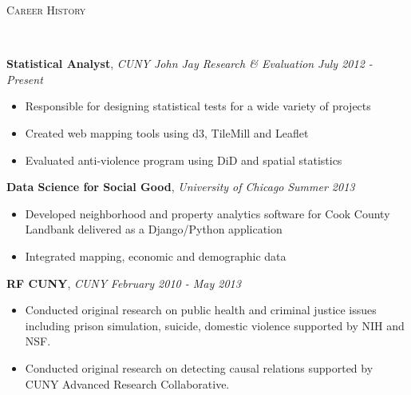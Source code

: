 \documentclass[9pt]{article}
\newenvironment{changemargin}[2]{%
  \begin{list}{}{%
    \setlength{\topsep}{0pt}%
    \setlength{\leftmargin}{#1}%
    \setlength{\rightmargin}{#2}%
    \setlength{\listparindent}{\parindent}%
    \setlength{\itemindent}{\parindent}%
    \setlength{\parsep}{\parskip}%
  }%
  \item[]}{\end{list}
}
\newcommand{\lineover}{
	\begin{changemargin}{-0.05in}{-0.05in}
		\vspace*{-8pt}
		\hrulefill \\
		\vspace*{-2pt}
	\end{changemargin}
}
\newcommand{\header}[1]{
	\begin{changemargin}{-0.5in}{-0.5in}
		\scshape{#1}\\
  	\lineover
	\end{changemargin}
}
\newenvironment{body} {
	\vspace*{-16pt}
	\begin{changemargin}{-0.25in}{-0.5in}
  }	
	{\end{changemargin}
}
\begin{document}
\smallskip



\header{Career History}

\begin{body}
	\vspace{14pt}
	\textbf{Statistical Analyst}, \emph{CUNY John Jay Research \& Evaluation} \hfill \emph{July 2012 - Present}\\
	\vspace*{-4pt}
	\begin{itemize} \itemsep -0pt  %
		\item Responsible for designing statistical tests for  a wide variety of projects
                \item Created web mapping tools using d3, TileMill and Leaflet
                \item Evaluated anti-violence program using DiD and spatial statistics
	\end{itemize}

	\textbf {Data Science for Social Good}, \emph{University of Chicago} \hfill \emph{Summer 2013}\\
	\vspace*{-4pt}
	\begin{itemize} \itemsep -0pt
		\item Developed neighborhood and property analytics software for Cook County Landbank delivered as a Django/Python application
		\item Integrated mapping, economic and demographic data
	\end{itemize}

	\textbf {RF CUNY}, \emph{CUNY} \hfill \emph{February 2010 - May 2013}\\
	\vspace*{-4pt}
	\begin{itemize} \itemsep -0pt
        \item Conducted original research on public health and
          criminal justice issues including prison simulation,
          suicide, domestic violence supported by NIH and NSF.
        \item Conducted original research on detecting causal
          relations supported by CUNY Advanced Research Collaborative.
	\end{itemize}

\end{body}
\end{document}
